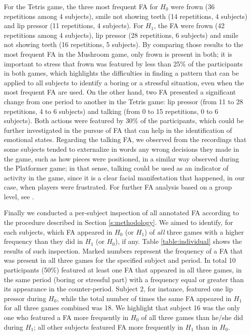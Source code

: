 For the Tetris game, the three most frequent FA for $H_0$ were frown (36 repetitions among 4 subjects), smile not showing teeth (14 repetitions, 4 subjects) and lip pressor (11 repetitions, 4 subjects). For $H_1$, the FA were frown (42 repetitions among 4 subjects), lip pressor (28 repetitions, 6 subjects) and smile not showing teeth (16 repetitions, 5 subjects). By comparing those results to the most frequent FA in the Mushroom game, only frown is present in both; it is important to stress that frown was featured by less than 25\% of the participants in both games, which highlights the difficulties in finding a pattern that can be applied to all subjects to identify a boring or a stressful situation, even when the most frequent FA are used. On the other hand, two FA presented a significant change from one period to another in the Tetris game: lip pressor (from 11 to 28 repetitions, 4 to 6 subjects) and talking (from 0 to 15 repetitions, 0 to 6 subjects). Both actions were featured by 30\% of the participants, which could be further investigated in the pursue of FA that can help in the identification of emotional states. Regarding the talking FA, we observed from the recordings that some subjects tended to externalize in words any wrong decisions they made in the game, such as how pieces were positioned, in a similar way observed during the Platformer game; in that sense, talking could be used as an indicator of activity in the game, since it is a clear facial manifestation that happened, in our case, when players were frustrated. For further FA analysis based on a group level, see \parencite{bevilacqua2016variations}.

Finally we conducted a per-subject inspection of all annotated FA according to the procedure described in Section \ref{s:methodology}. We aimed to identify, for each subjects, which FA appeared in $H_0$ (or $H_1$) of \emph{all} three games with a higher frequency than they did in $H_1$ (or $H_0$), if any. Table \ref{table:individual} shows the results of such inspection. Marked numbers represent the frequency of a FA that was present in all three games for the specified subject and period. In total 10 participants (50\%) featured at least one FA that appeared in all three games, in the same period (boring or stressful part) with a frequency equal or greater than its appearance in the counter-period. Subject 2, for instance, featured one lip pressor during $H_0$, while the total number of times the same FA appeared in $H_1$ for all three games combined was 18. We highlight that subject 16 was the only one who featured a FA more frequently in $H_0$ of all three games than he/she did during $H_1$; all other subjects featured FA more frequently in $H_1$ than in $H_0$.

